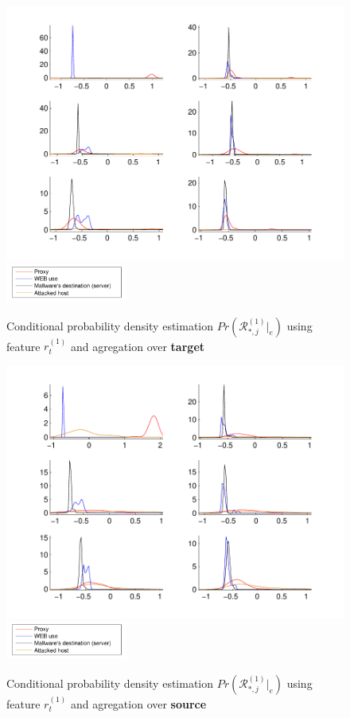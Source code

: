 \documentclass[a4paper]{IEEEtran}
\begin{document}
\begin{figure}[t!]%
  \centering
  \includegraphics[width=140mm]{dens_dst_bdivp}
      \includegraphics[width=40mm]{legend}
  \caption{Conditional probability density estimation $Pr ( \mathcal{R}^{(1)}_{*,j}|_e ) $ using feature $r_t^{(1)}$ and agregation over \textbf{target}}
  \label{fig:dens_dst_bdivp}
\end{figure}
\begin{figure}[t!]%
  \centering
  \includegraphics[width=140mm]{dens_src_bdivp}
    \includegraphics[width=40mm]{legend}
  \caption{Conditional probability density estimation $Pr ( \mathcal{R}^{(1)}_{*,j}|_e ) $ using feature $r_t^{(1)}$ and agregation over \textbf{source}}
  \label{fig:dens_src_bdivp}
\end{figure}
\end{document}
